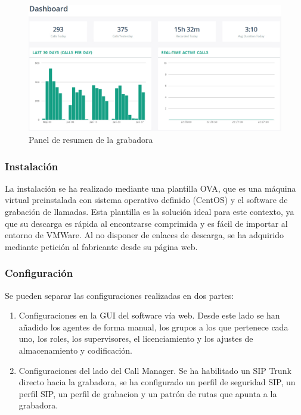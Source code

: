 \documentclass[a4paper, 12pt]{book}
\begin{document}
\begin{figure}[h!]
  \centering
  \includegraphics[scale=0.65]{img/fig_portada_recorder}
  \caption{Panel de resumen de la grabadora}
  \label{figura:fig_portada_recorder}
\end{figure}

\subsubsection{Instalación}
\label{sec:instalacion_grabadora}

La instalación se ha realizado mediante una plantilla OVA, que es una máquina virtual preinstalada con sistema operativo definido (CentOS) y el software de grabación de llamadas.
Esta plantilla es la solución ideal para este contexto, ya que su descarga es rápida al encontrarse comprimida y es fácil de importar al entorno de VMWare.
Al no disponer de enlaces de descarga, se ha adquirido mediante petición al fabricante desde su página web.

\subsubsection{Configuración}
\label{sec:configuracion_grabadora}

Se pueden separar las configuraciones realizadas en dos partes:
\begin{enumerate}
  \item Configuraciones en la GUI del software vía web. Desde este lado se han añadido los agentes de forma manual, los grupos a los que pertenece cada uno, los roles, los supervisores, el licenciamiento y los ajustes de almacenamiento y codificación.
  \item Configuraciones del lado del Call Manager. Se ha habilitado un SIP Trunk directo hacia la grabadora, se ha configurado un perfil de seguridad SIP, un perfil SIP, un perfil de grabacion y un patrón de rutas que apunta a la grabadora.
\end{enumerate}
\end{document}
